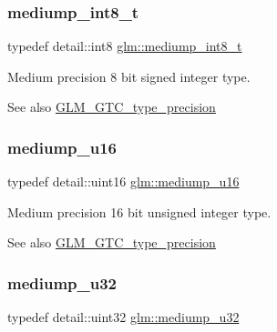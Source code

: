 \subsubsection{\texorpdfstring{mediump\+\_\+int8\+\_\+t}{mediump\_int8\_t}}
{\footnotesize\ttfamily typedef detail\+::int8 \hyperlink{group__gtc__type__precision_ga626ac5f73d3538e62a879d6c56abfb36}{glm\+::mediump\+\_\+int8\+\_\+t}}

Medium precision 8 bit signed integer type. \begin{DoxySeeAlso}{See also}
\hyperlink{group__gtc__type__precision}{G\+L\+M\+\_\+\+G\+T\+C\+\_\+type\+\_\+precision} 
\end{DoxySeeAlso}
\mbox{\label{group__gtc__type__precision_ga6745262ef6a6fdb8637b2387ef924828}} 
\subsubsection{\texorpdfstring{mediump\+\_\+u16}{mediump\_u16}}
{\footnotesize\ttfamily typedef detail\+::uint16 \hyperlink{group__gtc__type__precision_ga6745262ef6a6fdb8637b2387ef924828}{glm\+::mediump\+\_\+u16}}

Medium precision 16 bit unsigned integer type. \begin{DoxySeeAlso}{See also}
\hyperlink{group__gtc__type__precision}{G\+L\+M\+\_\+\+G\+T\+C\+\_\+type\+\_\+precision} 
\end{DoxySeeAlso}
\mbox{\label{group__gtc__type__precision_gad0c27a525045c299a92306eb4cd7c13a}} 
\subsubsection{\texorpdfstring{mediump\+\_\+u32}{mediump\_u32}}
{\footnotesize\ttfamily typedef detail\+::uint32 \hyperlink{group__gtc__type__precision_gad0c27a525045c299a92306eb4cd7c13a}{glm\+::mediump\+\_\+u32}}

